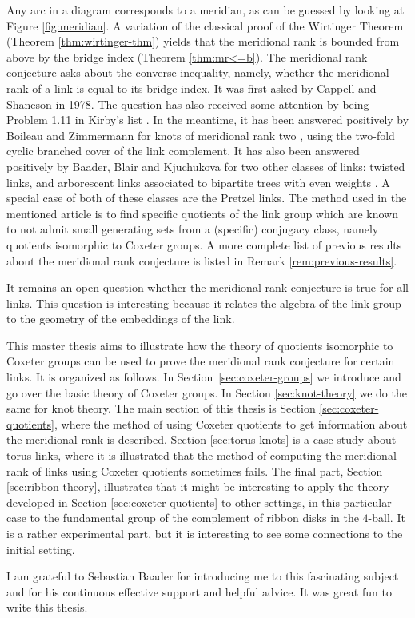 \documentclass[main.tex]{subfiles}
\begin{document}
Any arc in a diagram corresponds to a meridian, as can be guessed by looking at Figure \ref{fig:meridian}. A variation of the classical proof of the Wirtinger Theorem (Theorem \ref{thm:wirtinger-thm}) yields that the meridional rank is bounded from above by the bridge index (Theorem \ref{thm:mr<=b}).
The meridional rank conjecture asks about the converse inequality, namely, whether the meridional rank of a link is equal to its bridge index. It was first asked by Cappell and Shaneson \cite{cappell1978} in 1978. The question has also received some attention by being Problem 1.11 in Kirby's list \cite{kirby1995}.
In the meantime, it has been answered positively by Boileau and Zimmermann for knots of meridional rank two \cite{boileau1989},
using the two-fold cyclic branched cover of the link complement. It has also been answered positively by Baader, Blair and Kjuchukova for two other classes of links: twisted links, and arborescent
links associated to bipartite trees with even weights \cite{baader2019}.
A special case of both of these classes
are the Pretzel links. The method used in the mentioned article is to find specific quotients of the link group which are known to not admit small generating sets from a (specific) conjugacy class, namely quotients isomorphic to Coxeter groups. A more complete list of previous results about the meridional rank conjecture is listed in Remark \ref{rem:previous-results}.

It remains an open question whether the meridional rank conjecture is true for all links. This question is interesting because it relates the algebra of the link group to the geometry of the embeddings of the link.

This master thesis aims to illustrate how the theory of quotients isomorphic to Coxeter groups can be used to prove the meridional rank conjecture for certain links. It is organized as follows. In Section~\ref{sec:coxeter-groups} we introduce and go over the basic theory of Coxeter groups. In Section \ref{sec:knot-theory} we do the same for knot theory. The main section of this thesis is Section \ref{sec:coxeter-quotients}, where the method of using Coxeter quotients to get information about the meridional rank is described. Section \ref{sec:torus-knots} is a case study about torus links, where it is illustrated that the method of computing the meridional rank of links using Coxeter quotients sometimes fails. The final part, Section \ref{sec:ribbon-theory}, illustrates that it might be interesting to apply the theory developed in Section \ref{sec:coxeter-quotients} to other settings, in this particular case to the fundamental group of the complement of ribbon disks in the $4$-ball. It is a rather experimental part, but it is interesting to see some connections to the initial setting.

I am grateful to Sebastian Baader for introducing me to this fascinating subject and for his continuous effective support and helpful advice. It was great fun to write this thesis.
\end{document}
